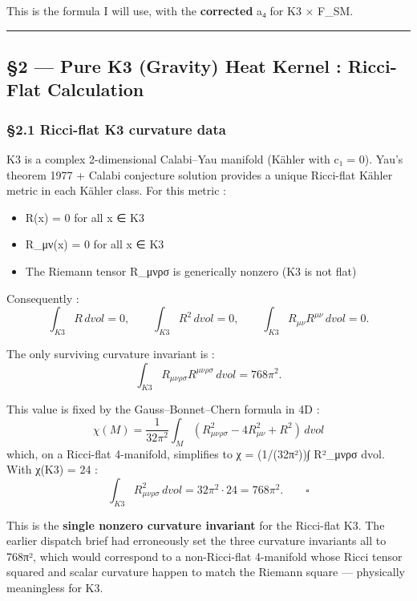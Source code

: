 \documentclass[
  11pt,
  a4paper,
]{article}
\providecommand{\tightlist}{\setlength{\itemsep}{0pt}\setlength{\parskip}{0pt}}
\providecommand{\tightlist}{%
  \setlength{\itemsep}{0pt}\setlength{\parskip}{0pt}}
\begin{document}
This is the formula I will use, with the \textbf{corrected} a₄ for K3 × F\_SM.

\begin{center}\rule{0.5\linewidth}{0.5pt}\end{center}

\hypertarget{pure-k3-gravity-heat-kernel-ricci-flat-calculation}{%
\subsection{§2 --- Pure K3 (Gravity) Heat Kernel : Ricci-Flat Calculation}\label{pure-k3-gravity-heat-kernel-ricci-flat-calculation}}

\hypertarget{ricci-flat-k3-curvature-data}{%
\subsubsection{§2.1 Ricci-flat K3 curvature data}\label{ricci-flat-k3-curvature-data}}

K3 is a complex 2-dimensional Calabi--Yau manifold (Kähler with c₁ = 0). Yau's theorem 1977 + Calabi conjecture solution provides a unique Ricci-flat Kähler metric in each Kähler class. For this metric :

\begin{itemize}
\tightlist
\item
  R(x) = 0 for all x ∈ K3
\item
  R\_μν(x) = 0 for all x ∈ K3
\item
  The Riemann tensor R\_μνρσ is generically nonzero (K3 is not flat)
\end{itemize}

Consequently :
\[
\int_{K3} R \, dvol = 0, \qquad \int_{K3} R^2 \, dvol = 0, \qquad \int_{K3} R_{\mu\nu} R^{\mu\nu} \, dvol = 0.
\]

The only surviving curvature invariant is :
\[
\int_{K3} R_{\mu\nu\rho\sigma} R^{\mu\nu\rho\sigma} \, dvol = 768\pi^{2}.
\]

This value is fixed by the Gauss--Bonnet--Chern formula in 4D :
\[
\chi(M) = \frac{1}{32\pi^2} \int_M (R_{\mu\nu\rho\sigma}^2 - 4 R_{\mu\nu}^2 + R^2) \, dvol
\]
which, on a Ricci-flat 4-manifold, simplifies to χ = (1/(32π²))∫ R²\_μνρσ dvol. With χ(K3) = 24 :
\[
\int_{K3} R^2_{\mu\nu\rho\sigma} \, dvol = 32\pi^2 \cdot 24 = 768\pi^2. \qquad \square
\]

This is the \textbf{single nonzero curvature invariant} for the Ricci-flat K3. The earlier dispatch brief had erroneously set the three curvature invariants all to 768π², which would correspond to a non-Ricci-flat 4-manifold whose Ricci tensor squared and scalar curvature happen to match the Riemann square --- physically meaningless for K3.
\end{document}
